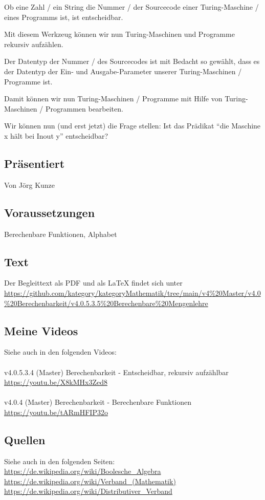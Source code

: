 \documentclass[a4paper]{amsart}
\theoremstyle{definition}
\begin{document}
Ob eine Zahl / ein String die Nummer / der Sourcecode einer Turing-Maschine / eines Programms ist, ist entscheidbar.

Mit diesem Werkzeug können wir nun Turing-Maschinen und Programme rekursiv aufzählen.

Der Datentyp der Nummer / des Sourcecodes ist mit Bedacht so gewählt, dass es der Datentyp der Ein- und Ausgabe-Parameter unserer Turing-Maschinen / Programme ist.

Damit können wir nun Turing-Maschinen / Programme mit Hilfe von Turing-Maschinen / Programmen bearbeiten.

Wir können nun (und erst jetzt) die Frage stellen: Ist das Prädikat "`die Maschine x hält bei Inout y"' entscheidbar?

\subsection*{Präsentiert}
Von Jörg Kunze

\subsection*{Voraussetzungen}
Berechenbare Funktionen, Alphabet

\subsection*{Text}
Der Begleittext als PDF und als LaTeX findet sich unter
{\tiny
   \url{https://github.com/kategory/kategoryMathematik/tree/main/v4%20Master/v4.0%20Berechenbarkeit/v4.0.5.3.5%20Berechenbare%20Mengenlehre}
}

\subsection*{Meine Videos}
Siehe auch in den folgenden Videos:\\
\\
v4.0.5.3.4 (Master) Berechenbarkeit - Entscheidbar, rekursiv aufzählbar\\
\url{https://youtu.be/X8kMHx3Zed8}\\
\\
v4.0.4 (Master) Berechenbarkeit - Berechenbare Funktionen\\
\url{https://youtu.be/tARmHFIP32o}

\subsection*{Quellen}
Siehe auch in den folgenden Seiten:\\
\url{https://de.wikipedia.org/wiki/Boolesche_Algebra}\\
\url{https://de.wikipedia.org/wiki/Verband_(Mathematik)}\\
\url{https://de.wikipedia.org/wiki/Distributiver_Verband}
\end{document}
